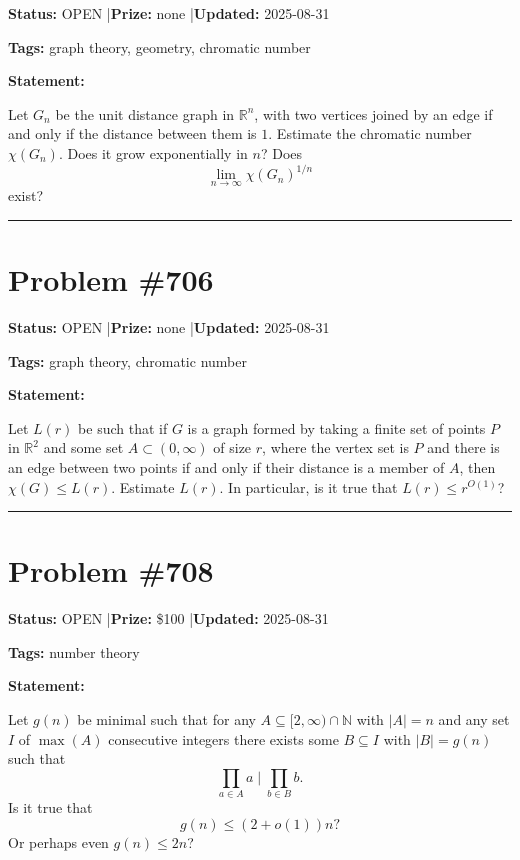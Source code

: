 \documentclass{article}
\begin{document}
\noindent\textbf{Status:} OPEN \quad|\quad \textbf{Prize:} none \quad|\quad \textbf{Updated:} 2025-08-31

\noindent\textbf{Tags:} graph theory, geometry, chromatic number

\medskip

\noindent\textbf{Statement:}

Let $G_n$ be the unit distance graph in $\mathbb{R}^n$, with two vertices joined by an edge if and only if the distance between them is $1$. Estimate the chromatic number $\chi(G_n)$. Does it grow exponentially in $n$? Does\[\lim_{n\to \infty}\chi(G_n)^{1/n}\]exist?

\noindent\rule{\linewidth}{0.4pt}


\section{Problem \#706}
\label{prob:706}

\noindent\textbf{Status:} OPEN \quad|\quad \textbf{Prize:} none \quad|\quad \textbf{Updated:} 2025-08-31

\noindent\textbf{Tags:} graph theory, chromatic number

\medskip

\noindent\textbf{Statement:}

Let $L(r)$ be such that if $G$ is a graph formed by taking a finite set of points $P$ in $\mathbb{R}^2$ and some set $A\subset (0,\infty)$ of size $r$, where the vertex set is $P$ and there is an edge between two points if and only if their distance is a member of $A$, then $\chi(G)\leq L(r)$. Estimate $L(r)$. In particular, is it true that $L(r)\leq r^{O(1)}$?

\noindent\rule{\linewidth}{0.4pt}


\section{Problem \#708}
\label{prob:708}

\noindent\textbf{Status:} OPEN \quad|\quad \textbf{Prize:} \$100 \quad|\quad \textbf{Updated:} 2025-08-31

\noindent\textbf{Tags:} number theory

\medskip

\noindent\textbf{Statement:}

Let $g(n)$ be minimal such that for any $A\subseteq [2,\infty)\cap \mathbb{N}$ with $\lvert A\rvert =n$ and any set $I$ of $\max(A)$ consecutive integers there exists some $B\subseteq I$ with $\lvert B\rvert=g(n)$ such that\[\prod_{a\in A} a \mid \prod_{b\in B}b.\]Is it true that\[g(n) \leq (2+o(1))n?\]Or perhaps even $g(n)\leq 2n$?
\end{document}
